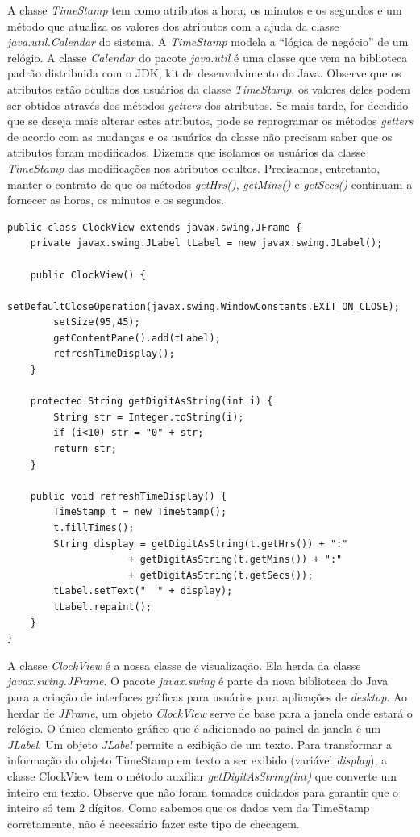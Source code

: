 \documentclass[
	article,			%
	12pt,				%
	openright,
	twoside,			%
	a4paper,			%
	english,			%
	french,
	brazil,				%
	sumario=tradicional
	]{abntex2}
\begin{document}
A classe \emph{TimeStamp} tem como atributos a hora, os minutos e os segundos e um método que atualiza os valores dos atributos com a ajuda da classe \emph{java.util.Calendar} do sistema. A \emph{TimeStamp} modela a ``lógica de negócio'' de um relógio. A classe \emph{Calendar} do pacote \emph{java.util} é uma classe que vem na biblioteca padrão distribuida com o JDK, kit de desenvolvimento do Java. Observe que os atributos estão ocultos dos usuários da classe \emph{TimeStamp}, os valores deles podem ser obtidos através dos métodos \textit{getters} dos atributos. Se mais tarde, for decidido que se deseja mais alterar estes atributos, pode se reprogramar os métodos \textit{getters} de acordo com as mudanças e os usuários da classe não precisam saber que os atributos foram modificados. Dizemos que isolamos os usuários da classe \emph{TimeStamp} das modificações nos atributos ocultos. Precisamos, entretanto, manter o contrato de que os métodos \emph{getHrs()}, \emph{getMins()} e \emph{getSecs()} continuam a fornecer as horas, os minutos e os segundos.

\begin{verbatim}
public class ClockView extends javax.swing.JFrame {
    private javax.swing.JLabel tLabel = new javax.swing.JLabel();
    
    public ClockView() {
        setDefaultCloseOperation(javax.swing.WindowConstants.EXIT_ON_CLOSE);
        setSize(95,45);
        getContentPane().add(tLabel);
        refreshTimeDisplay();
    }
    
    protected String getDigitAsString(int i) {
        String str = Integer.toString(i);
        if (i<10) str = "0" + str;
        return str;
    }
    
    public void refreshTimeDisplay() {
        TimeStamp t = new TimeStamp();
        t.fillTimes();
        String display = getDigitAsString(t.getHrs()) + ":"
                     + getDigitAsString(t.getMins()) + ":"
                     + getDigitAsString(t.getSecs());
        tLabel.setText("  " + display);
        tLabel.repaint();
    }
}
\end{verbatim}

A classe \emph{ClockView} é a nossa classe de visualização. Ela herda da classe \emph{javax.swing.JFrame}. O pacote \emph{javax.swing} é parte da nova biblioteca do Java para a criação de interfaces gráficas para usuários para aplicações de \textit{desktop}. Ao herdar de \emph{JFrame}, um objeto \emph{ClockView} serve de base para a janela onde estará o relógio. O único elemento gráfico que é adicionado ao painel da janela é um \emph{JLabel}. Um objeto \emph{JLabel} permite a exibição de um texto. Para transformar a informação do objeto TimeStamp em texto a ser exibido (variável \emph{display}), a classe ClockView tem o método auxiliar \emph{getDigitAsString(int)} que converte um inteiro em texto. Observe que não foram tomados cuidados para garantir que o inteiro só tem 2 dígitos. Como sabemos que os dados vem da TimeStamp corretamente, não é necessário fazer este tipo de checagem.
\end{document}
